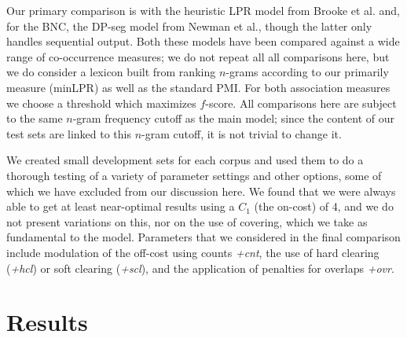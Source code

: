 \documentclass[11pt]{article}
\makeatletter
\def \al {al.\@ }
\makeatother
\begin{document}
Our primary comparison is with the heuristic LPR model from Brooke et \al {} and, for the BNC, the DP-seg model from Newman et \al {}, though the latter only handles sequential output. Both these models have been compared against a wide range of co-occurrence measures; we do not repeat all all comparisons here, but we do consider a lexicon built from ranking $n$-grams according to our primarily measure (minLPR) as well as the standard PMI. For both association measures we choose a threshold which maximizes $f$-score. All comparisons here are subject to the same $n$-gram frequency cutoff as the main model; since the content of our test sets are linked to this $n$-gram cutoff, it is not trivial to change it.

We created small development sets for each corpus and used them to do a thorough testing of a variety of parameter settings and other options, some of which we have excluded from our  discussion here. We found that we were always able to get at least near-optimal results using a $C_1$ (the on-cost) of 4, and we do not present variations on this, nor on the use of covering, which we take as fundamental to the model. Parameters that we considered in the final comparison include modulation of the off-cost using counts \emph{+cnt}, the use of hard clearing (\emph{+hcl}) or soft clearing (\emph{+scl}), and the application of penalties for overlaps \emph{+ovr}.

\section{Results}
\end{document}
